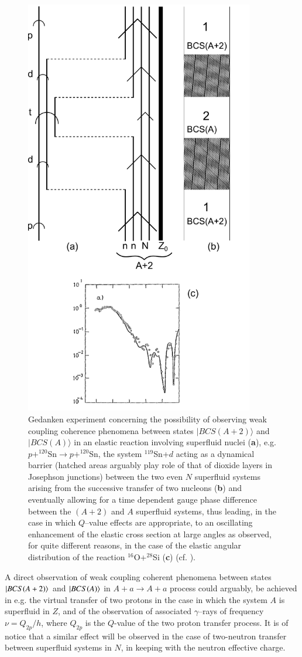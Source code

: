 \begin{figure}\centerline{\includegraphics*[width=10cm,angle=0]{nutshell/figs/fig3D1.pdf}}
\caption{Gedanken experiment concerning the possibility of observing weak coupling coherence phenomena between states $|BCS(A+2)\rangle$ and $|BCS(A)\rangle$ in an elastic reaction involving superfluid nuclei (\textbf{a}), e.g. $p+^{120}$Sn$\rightarrow p+^{120}$Sn, the system $^{119}$Sn+$d$ acting as a dynamical barrier (hatched areas arguably play role of that of dioxide layers in Josephson junctions) between the two even $N$ superfluid systems arising from the successive transfer of two nucleons (\textbf{b}) and eventually allowing for  a time dependent gauge phase difference between the $(A+2)$ and $A$ superfluid systems, thus leading, in the case in which $Q$--value effects are appropriate, to an oscillating enhancement of the elastic cross section at large angles as observed, for quite different reasons, in the case of the elastic angular distribution of the reaction $^{16}$O+$^{28}$Si (\textbf{c}) (cf. \cite{Pollarolo:84}).}\label{fig3.C.1}
\end{figure}
A direct observation of weak coupling coherent phenomena between states $|{BCS(A+2)} \rangle$ and $|{BCS(A)} \rangle$ in $A+a\to A+a$ process could arguably, be achieved in e.g. the virtual transfer of two protons in the case in which the system $A$ is superfluid in $Z$, and of the observation of  associated $\gamma$--rays of frequency $\nu=Q_{2p}/h$, where $Q_{2p}$ is the $Q$-value of the two proton transfer process. It is of notice that a similar effect will be observed in the case of two-neutron transfer between superfluid systems in $N$, in keeping with the neutron effective charge.
